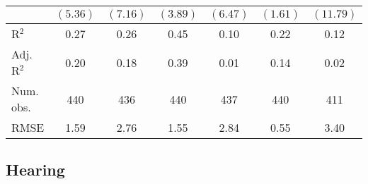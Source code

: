 \documentclass[fullpage]{paper}
\begin{document}
\begin{center}
\begin{longtable}{l c c c c c c }
            & $(5.36)$      & $(7.16)$       & $(3.89)$       & $(6.47)$      & $(1.61)$      & $(11.79)$     \\
\hline
R$^2$       & 0.27          & 0.26           & 0.45           & 0.10          & 0.22          & 0.12          \\
Adj. R$^2$  & 0.20          & 0.18           & 0.39           & 0.01          & 0.14          & 0.02          \\
Num. obs.   & 440           & 436            & 440            & 437           & 440           & 411           \\
RMSE        & 1.59          & 2.76           & 1.55           & 2.84          & 0.55          & 3.40          \\
\end{longtable}
\end{center}
\subsection{ Hearing }
\end{document}
